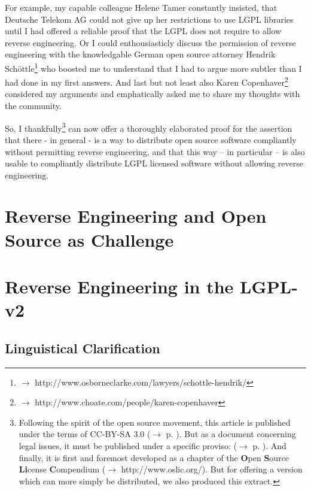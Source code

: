\documentclass[DIV=calc,BCOR=5mm,12pt,headings=small,oneside,toc=bib]{scrartcl}
\begin{document}
For example, my capable colleague Helene Tamer constantly insisted, that
Deutsche Telekom AG could not give up her restrictions to use LGPL libraries
until I had offered a reliable proof that the LGPL does not require to allow
reverse engineering. Or I could enthousiasticly discuss the permission of
reverse engineering with the knowledgable German open source attorney Hendrik
Schöttle\footnote{$\rightarrow$
http://www.osborneclarke.com/lawyers/schottle-hendrik/} who boosted me to
understand that I had to argue more subtler than I had done in my first answers.
And last but not least also Karen Copenhaver\footnote{$\rightarrow$
http://www.choate.com/people/karen-copenhaver} considered my arguments and
emphatically asked me to share my thoughts with the community.

So, I thankfully\footnote{Following the spirit of the open source movement, this
article is published under the terms of CC-BY-SA 3.0 ($\rightarrow$ p.
\pageref{License}). But as a document concerning legal issues, it must  be
published under a specific proviso: ($\rightarrow$ p. \pageref{Disclaimer}). And
finally, it is first and foremost developed as a chapter of the \textbf{O}pen
\textbf{S}ource \textbf{Li}cense \textbf{C}ompendium ($\rightarrow$
http://www.oslic.org/). But for offering a version which can more simply be
distributed, we also produced this extract.} can now offer a thoroughly
elaborated proof for the assertion that there - in general - is a way to
distribute open source software compliantly without permitting reverse
engineering, and that this way -- in particular -- is also usable to compliantly
distribute LGPL licensed software without allowing reverse engineering.

\footnotesize
\tableofcontents
\normalsize

\section{Reverse Engineering and Open Source as Challenge}

\section{Reverse Engineering in the LGPL-v2}

\subsection{Linguistical Clarification}

\end{document}
